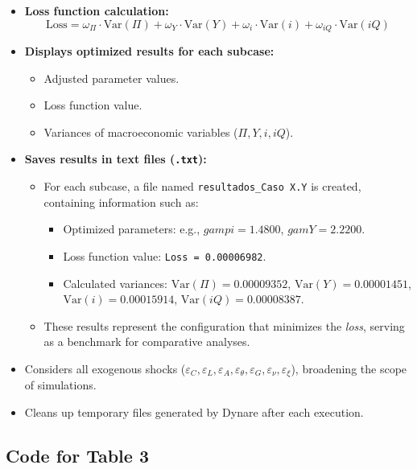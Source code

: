 \documentclass[12pt]{article}
\begin{document}
\begin{itemize}
\begin{itemize}
    \end{itemize}
    \item \textbf{Loss function calculation:}
    \[
    \text{Loss} = \omega_\Pi \cdot \text{Var}(\Pi) + \omega_Y \cdot \text{Var}(Y) + \omega_i \cdot \text{Var}(i) + \omega_{iQ} \cdot \text{Var}(iQ)
    \]
    \item \textbf{Displays optimized results for each subcase:}
    \begin{itemize}
        \item Adjusted parameter values.
        \item Loss function value.
        \item Variances of macroeconomic variables (\(\Pi, Y, i, iQ\)).
    \end{itemize}
    \item \textbf{Saves results in text files (\texttt{.txt}):}
    \begin{itemize}
        \item For each subcase, a file named \texttt{resultados\_Caso X.Y} is created, containing information such as:
        \begin{itemize}
            \item Optimized parameters: e.g., \(gampi = 1.4800\), \(gamY = 2.2200\).
            \item Loss function value: \texttt{Loss = 0.00006982}.
            \item Calculated variances: \(\text{Var}(\Pi) = 0.00009352\), \(\text{Var}(Y) = 0.00001451\), \(\text{Var}(i) = 0.00015914\), \(\text{Var}(iQ) = 0.00008387\).
        \end{itemize}
        \item These results represent the configuration that minimizes the \textit{loss}, serving as a benchmark for comparative analyses.
    \end{itemize}
    \item Considers all exogenous shocks (\(\varepsilon_C, \varepsilon_L, \varepsilon_A, \varepsilon_\theta, \varepsilon_G, \varepsilon_\nu, \varepsilon_\xi\)), broadening the scope of simulations.
    \item Cleans up temporary files generated by Dynare after each execution.
\end{itemize}


\subsection{Code for Table 3}
\end{document}
